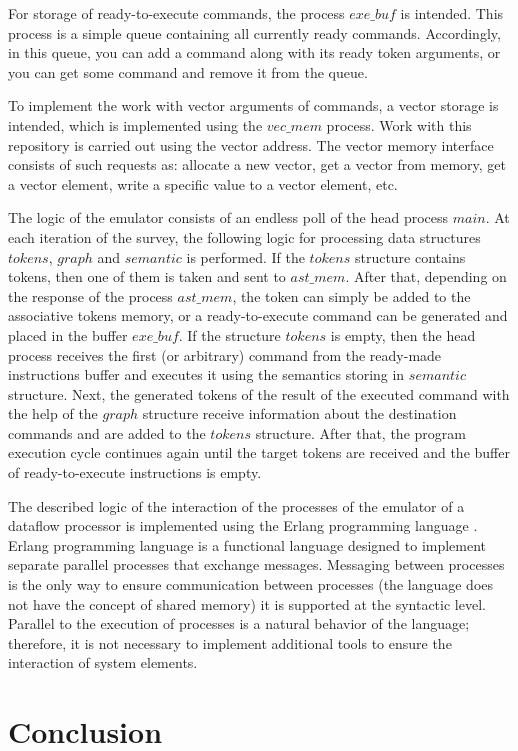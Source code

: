 \documentclass[
11pt,%
tightenlines,%
twoside,%
onecolumn,%
nofloats,%
nobibnotes,%
nofootinbib,%
superscriptaddress,%
noshowpacs,%
centertags]%
{revtex4}
\begin{document}
For storage of ready-to-execute commands, the process $exe\_buf$ is intended.
This process is a simple queue containing all currently ready commands.
Accordingly, in this queue, you can add a command along with its ready token arguments, or you can get some command and remove it from the queue.

To implement the work with vector arguments of commands, a vector storage is intended, which is implemented using the $vec\_mem$ process.
Work with this repository is carried out using the vector address.
The vector memory interface consists of such requests as: allocate a new vector, get a vector from memory, get a vector element, write a specific value to a vector element, etc.

The logic of the emulator consists of an endless poll of the head process $main$.
At each iteration of the survey, the following logic for processing data structures $tokens$, $graph$ and $semantic$ is performed.
If the $tokens$ structure contains tokens, then one of them is taken and sent to $ast\_mem$.
After that, depending on the response of the process $ast\_mem$, the token can simply be added to the associative tokens memory, or a ready-to-execute command can be generated and placed in the buffer $exe\_buf$.
If the structure $tokens$ is empty, then the head process receives the first (or arbitrary) command from the ready-made instructions buffer and executes it using the semantics storing in $semantic$ structure.
Next, the generated tokens of the result of the executed command with the help of the $graph$ structure receive information about the destination commands and are added to the $tokens$ structure.
After that, the program execution cycle continues again until the target tokens are received and the buffer of ready-to-execute instructions is empty.

The described logic of the interaction of the processes of the emulator of a dataflow processor is implemented using the Erlang programming language \cite {Armstrong, Cesarini}.
Erlang programming language is a functional language designed to implement separate parallel processes that exchange messages.
Messaging between processes is the only way to ensure communication between processes (the language does not have the concept of shared memory) it is supported at the syntactic level.
Parallel to the execution of processes is a natural behavior of the language; therefore, it is not necessary to implement additional tools to ensure the interaction of system elements.

\section{Conclusion}
\end{document}
